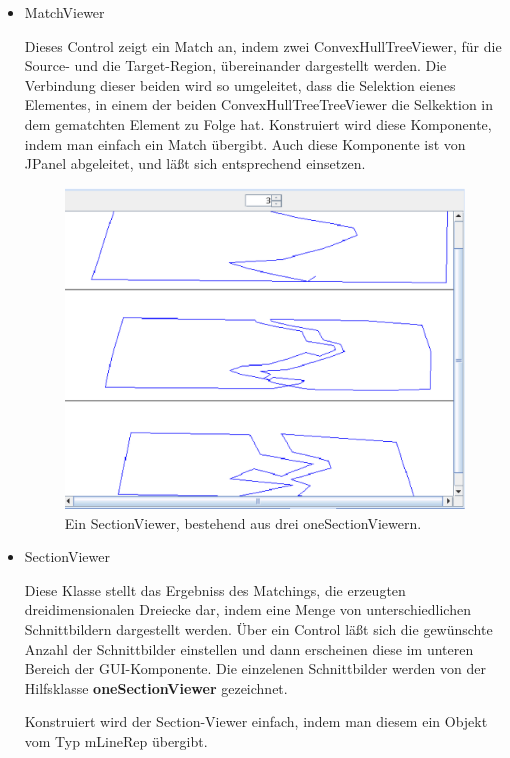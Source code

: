 \begin{itemize}
\item MatchViewer

Dieses Control zeigt ein Match an, indem zwei ConvexHullTreeViewer, für die Source- und die Target-Region, übereinander dargestellt werden. Die Verbindung dieser beiden wird so umgeleitet, dass die Selektion eienes Elementes, in einem der beiden ConvexHullTreeTreeViewer die Selkektion in dem gematchten Element zu Folge hat. Konstruiert wird diese Komponente, indem man einfach ein Match übergibt. Auch diese Komponente ist von JPanel abgeleitet, und läßt sich entsprechend einsetzen.

\begin{figure}
	\centering
	\includegraphics[scale=0.5]{Sectionviewer.eps}
	\caption{Ein SectionViewer, bestehend aus drei oneSectionViewern.}
	\label{fig:SectionViewer}
\end{figure}


\item SectionViewer

Diese Klasse stellt das Ergebniss des Matchings, die erzeugten dreidimensionalen Dreiecke dar, indem eine Menge von unterschiedlichen Schnittbildern dargestellt werden. Über ein Control läßt sich die gewünschte Anzahl der Schnittbilder einstellen und dann erscheinen diese im unteren Bereich der GUI-Komponente. Die einzelenen Schnittbilder werden von der Hilfsklasse  \textbf{oneSectionViewer} gezeichnet.

Konstruiert wird der Section-Viewer einfach, indem man diesem ein Objekt vom Typ mLineRep übergibt.



\end{itemize}
